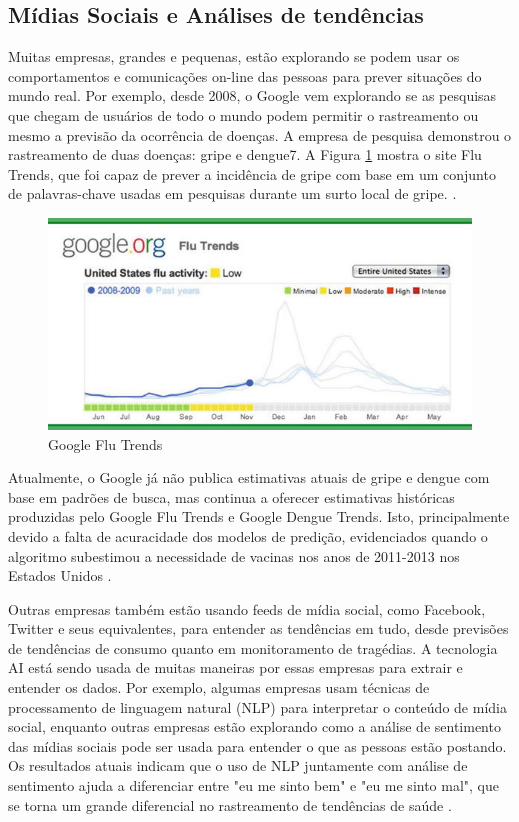 \documentclass[
	12pt,				%
	openright,			%
	oneside,			%
	a4paper,			%
	english,			%
	spanish,			%
	brazil				%
	]{abntex2}
\begin{document}
	\subsection*{Mídias Sociais e Análises de tendências}
	Muitas empresas, grandes e pequenas, estão explorando se podem usar os comportamentos e comunicações on-line das pessoas para prever situações do mundo real. Por exemplo, desde 2008, o Google vem explorando se as pesquisas que chegam de usuários de todo o mundo podem permitir o rastreamento ou mesmo a previsão da ocorrência de doenças. A empresa de pesquisa demonstrou o rastreamento de duas doenças: gripe e dengue7. A Figura \ref{google_flu} mostra o site Flu Trends, que foi capaz de prever a incidência de gripe com base em um conjunto de palavras-chave usadas em pesquisas durante um surto local de gripe. \cite{book_social_machines}.

\begin{figure}[!h]
\centering
\includegraphics{google_flu}
\caption{Google Flu Trends}
\label{google_flu}
\end{figure}


Atualmente, o Google já não publica estimativas atuais de gripe e dengue com base em padrões de busca, mas continua a oferecer estimativas históricas produzidas pelo Google Flu Trends e Google Dengue Trends. Isto, principalmente devido a falta de acuracidade dos modelos de predição, evidenciados quando o algoritmo subestimou a necessidade de vacinas nos anos de 2011-2013 nos Estados Unidos  \cite{article_google_flu}.

Outras empresas também estão usando feeds de mídia social, como Facebook, Twitter e seus equivalentes, para entender as tendências em tudo, desde previsões de tendências de consumo quanto em monitoramento de tragédias. A tecnologia AI está sendo usada de muitas maneiras por essas empresas para extrair e entender os dados. Por exemplo, algumas empresas usam técnicas de processamento de linguagem natural (NLP) para interpretar o conteúdo de mídia social, enquanto outras empresas estão explorando como a análise de sentimento das mídias sociais pode ser usada para entender o que as pessoas estão postando. Os resultados atuais indicam que o uso de NLP juntamente com análise de sentimento ajuda a diferenciar entre "eu me sinto bem" e "eu me sinto mal", que se torna um grande diferencial no rastreamento de tendências de saúde \cite{book_social_machines}.
	
\end{document}
